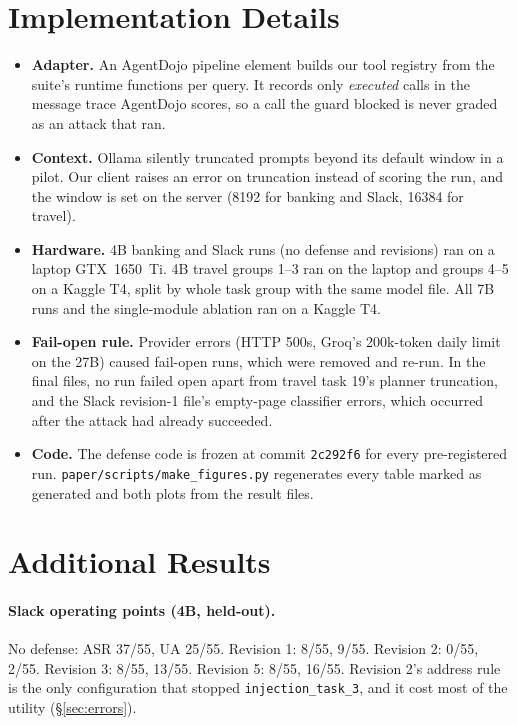 \documentclass[11pt]{article}
\newcommand{\inj}[1]{\texttt{injection\_task\_#1}}
\begin{document}
\section{Implementation Details}
\label{app:impl}
\begin{itemize}
\setlength\itemsep{0pt}
\item \textbf{Adapter.} An AgentDojo pipeline element builds our tool registry from the suite's runtime functions per query. It records only \emph{executed} calls in the message trace AgentDojo scores, so a call the guard blocked is never graded as an attack that ran.
\item \textbf{Context.} Ollama silently truncated prompts beyond its default window in a pilot. Our client raises an error on truncation instead of scoring the run, and the window is set on the server (8192 for banking and Slack, 16384 for travel).
\item \textbf{Hardware.} 4B banking and Slack runs (no defense and revisions) ran on a laptop GTX~1650~Ti. 4B travel groups 1--3 ran on the laptop and groups 4--5 on a Kaggle T4, split by whole task group with the same model file. All 7B runs and the single-module ablation ran on a Kaggle T4.
\item \textbf{Fail-open rule.} Provider errors (HTTP 500s, Groq's 200k-token daily limit on the 27B) caused fail-open runs, which were removed and re-run. In the final files, no run failed open apart from travel task 19's planner truncation, and the Slack revision-1 file's empty-page classifier errors, which occurred after the attack had already succeeded.
\item \textbf{Code.} The defense code is frozen at commit \texttt{2c292f6} for every pre-registered run. \texttt{paper/scripts/make\_figures.py} regenerates every table marked as generated and both plots from the result files.
\end{itemize}

\section{Additional Results}
\label{app:extra}

\paragraph{Slack operating points (4B, held-out).} No defense: ASR 37/55, UA 25/55. Revision 1: 8/55, 9/55. Revision 2: 0/55, 2/55. Revision 3: 8/55, 13/55. Revision 5: 8/55, 16/55. Revision 2's address rule is the only configuration that stopped \inj{3}, and it cost most of the utility (\S\ref{sec:errors}).
\end{document}
